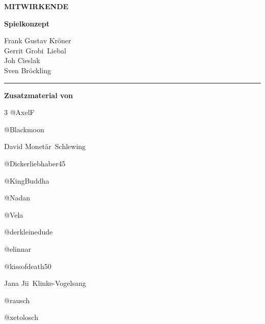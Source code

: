 \thispagestyle{empty}
\begin{center}
    \vspace*{0.14\textheight}
    {\titlefont\bfseries\fontsize{30}{36}\selectfont MITWIRKENDE\par}
    \vspace{0.65cm}
    \vspace{1.35cm}

    \begin{minipage}{0.58\textwidth}
        \centering
        {\titlefont\large\bfseries Spielkonzept\par}
        \vspace{0.25cm}
        Frank Gustav Kröner\\
        Gerrit \glqq Grobi\grqq\ Liebal\\
        Joh Cieslak\\
        Sven Bröckling
    \end{minipage}
    \vspace{1.25cm}

    \rule{0.55\textwidth}{0.4pt}\par
    \vspace{0.55cm}
    {\titlefont\large\bfseries Zusatzmaterial von\par}
    \vspace{0.5cm}
\end{center}
\begin{multicols}{3}
    \centering
    @AxelF\par
    @Blackmoon\par
    David \glqq Monetär\grqq\ Schlewing\par
    @Dickerliebhaber45\par
    @KingBuddha\par
    @Nadan\par
    @Vela\par
    @derkleinedude\par
    @elinnar\par
    @kissofdeath50\par
    Jana \glqq Jii\grqq\ Klinke-Vogelsang\par
    @rausch\par
    @xetolosch\par
\end{multicols}
\vfill
\clearpage
